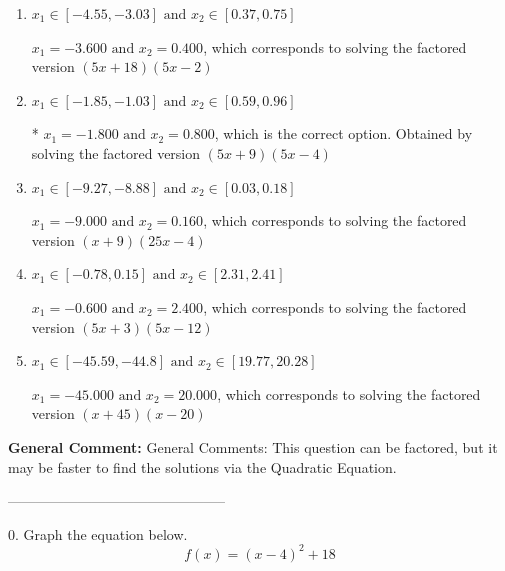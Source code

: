 \documentclass{extbook}[14pt]
\begin{document}
\begin{enumerate}[label=\Alph*.] 
\item $ x_1 \in [-4.55, -3.03] \text{ and } x_2 \in [0.37, 0.75] $ 

 $x_1 = -3.600 \text{ and } x_2 = 0.400$, which corresponds to solving the factored version $(5x + 18)(5x -2)$ 
\item $ x_1 \in [-1.85, -1.03] \text{ and } x_2 \in [0.59, 0.96] $ 

 * $x_1 = -1.800 \text{ and } x_2 = 0.800$, which is the correct option. Obtained by solving the factored version $(5x + 9)(5x -4)$ 
\item $ x_1 \in [-9.27, -8.88] \text{ and } x_2 \in [0.03, 0.18] $ 

 $x_1 = -9.000 \text{ and } x_2 = 0.160$, which corresponds to solving the factored version $(x + 9)(25x -4)$ 
\item $ x_1 \in [-0.78, 0.15] \text{ and } x_2 \in [2.31, 2.41] $ 

 $x_1 = -0.600 \text{ and } x_2 = 2.400$, which corresponds to solving the factored version $(5x + 3)(5x -12)$ 
\item $ x_1 \in [-45.59, -44.8] \text{ and } x_2 \in [19.77, 20.28] $ 

 $x_1 = -45.000 \text{ and } x_2 = 20.000$, which corresponds to solving the factored version $(x + 45)(x -20)$ 
\end{enumerate} 
 
\textbf{General Comment:} General Comments: This question can be factored, but it may be faster to find the solutions via the Quadratic Equation. 

-----------------------------------------------

0. Graph the equation below.
\[ f(x) = (x-4)^2 + 18 \] 
\end{document}

